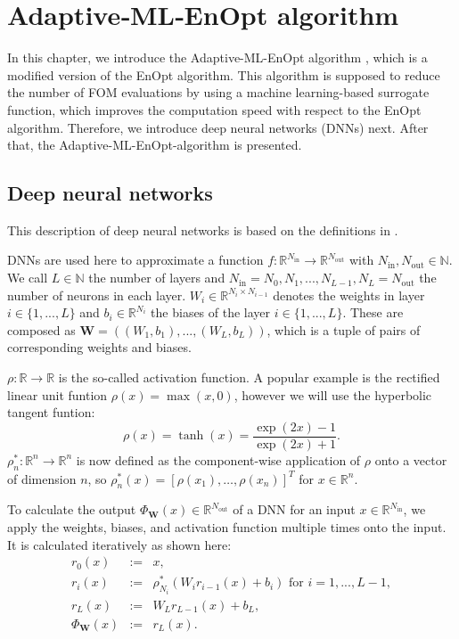 \chapter{Adaptive‑ML‑EnOpt algorithm}

In this chapter, we introduce the Adaptive-ML-EnOpt algorithm \cite{Keil2022-dj}, which is a modified version of the EnOpt algorithm. This algorithm is supposed to reduce the number of FOM evaluations by using a machine learning-based surrogate function, which improves the computation speed with respect to the EnOpt algorithm. Therefore, we introduce deep neural networks (DNNs) next. After that, the Adaptive-ML-EnOpt-algorithm is presented.

\section{Deep neural networks}

This description of deep neural networks is based on the definitions in \cite{Keil2022-dj}.

DNNs are used here to approximate a function $f:\mathbb{R}^{N_{\mathrm{in}}}\to\mathbb{R}^{N_{\mathrm{out}}}$ with $N_{\mathrm{in}},N_{\mathrm{out}}\in\mathbb{N}$. We call $L\in\mathbb{N}$ the number of layers and $N_{\mathrm{in}}=N_0,N_1,...,N_{L-1}, N_L=N_{\mathrm{out}}$ the number of neurons in each layer. $W_i\in\mathbb{R}^{N_i\times N_{i-1}}$ denotes the weights in layer $i\in\{1,...,L\}$ and $b_i\in\mathbb{R}^{N_i}$ the biases of the layer $i\in\{1,...,L\}$. These are composed as $\mathbf{W}=\left((W_1,b_1),...,(W_L,b_L)\right)$, which is a tuple of pairs of corresponding weights and biases.

$\rho:\mathbb{R}\to\mathbb{R}$ is the so-called activation function. A popular example is the rectified linear unit funtion $\rho(x)=\operatorname{max}(x,0)$, however we will use the hyperbolic tangent funtion:
\begin{displaymath}
\rho(x)=\tanh(x)=\frac{\exp(2x)-1}{\exp(2x)+1}.
\end{displaymath}
$\rho_n^*:\mathbb{R}^n\to\mathbb{R}^n$ is now defined as the component-wise application of $\rho$ onto a vector of dimension $n$, so $\rho_n^*(x)=\left[\rho(x_1),\dotsc,\rho(x_n)\right]^T$ for $x\in\mathbb{R}^n$.

To calculate the output $\Phi_\mathbf{W}(x)\in\mathbb{R}^{N_{\mathrm{out}}}$ of a DNN for an input $x\in\mathbb{R}^{N_{\mathrm{in}}}$, we apply the weights, biases, and activation function multiple times onto the input. It is calculated iteratively as shown here:
\begin{eqnarray*}
r_0(x)&:=&x,\\
r_i(x)&:=&\rho_{N_i}^*(W_ir_{i-1}(x)+b_i)\text{ for }i=1,...,L-1,\\
r_L(x)&:=&W_Lr_{L-1}(x)+b_L,\\
\Phi_\mathbf{W}(x)&:=&r_L(x).
\end{eqnarray*}

